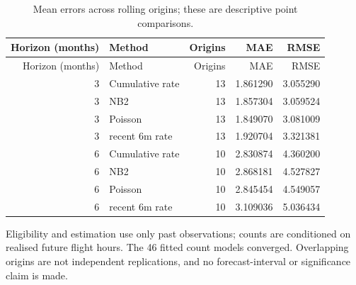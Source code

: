 \begin{small}

\setlength{\tabcolsep}{4pt}

\begin{longtable}{rlrrr}

\caption{Mean errors across rolling origins; these are descriptive point comparisons.}\label{tab:s-forecasts}\\

\toprule

Horizon (months) & Method & Origins & MAE & RMSE \\

\midrule

\endfirsthead

\toprule

Horizon (months) & Method & Origins & MAE & RMSE \\

\midrule

\endhead

3 & Cumulative rate & 13 & 1.861290 & 3.055290 \\

3 & NB2 & 13 & 1.857304 & 3.059524 \\

3 & Poisson & 13 & 1.849070 & 3.081009 \\

3 & recent 6m rate & 13 & 1.920704 & 3.321381 \\

6 & Cumulative rate & 10 & 2.830874 & 4.360200 \\

6 & NB2 & 10 & 2.868181 & 4.527827 \\

6 & Poisson & 10 & 2.845454 & 4.549057 \\

6 & recent 6m rate & 10 & 3.109036 & 5.036434 \\

\bottomrule

\end{longtable}

\end{small}

Eligibility and estimation use only past observations; counts are conditioned on realised future flight hours. The 46 fitted count models converged. Overlapping origins are not independent replications, and no forecast-interval or significance claim is made.

